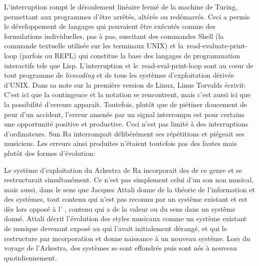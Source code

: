 {L'interruption rompt le d\'eroulement lin\'eaire ferm\'e de la machine
de Turing, permettant aux programmes d'\^etre arr\^et\'es, alt\'er\'es
ou red\'emarr\'es. Ceci a permis le d\'eveloppement de langages qui
pouvaient \^etre ex\'ecut\'es comme des formulations individuelles, pas
\`a pas, suscitant des commandes Shell (la commande textuelle
utilis\'ee sur les terminaux UNIX) et la~read{}-evaluate{}-print{}-loop
(parfois  ou REPL) qui constitue la base
des langages de programmation interactifs tels que Lisp. L'interruption
et le~read{}-eval{}-print{}-loop sont au c{\oe}ur de tout programme de
{\em livecoding} et de tous les syst\`emes d'exploitation
d\'eriv\'es d'UNIX. Dans sa note sur la premi\`ere version de Linux,
Linus Torvalds \'ecrivit: 
C'est ici que la contingence et la notation se rencontrent, mais c'est
aussi ici que la possibilit\'e d'erreurs appara\^it. Toutefois,
plut\^ot que de pi\'etiner doucement de peur d'un accident, l'erreur
amen\'ee par un signal interrompu est pour certains une opportunit\'e
positive et productive. Ceci n'est pas limit\'e \`a des interruptions
d'ordinateurs. Sun Ra interrompait d\'elib\'er\'ement ses
r\'ep\'etitions et pi\'egeait ses musiciens. Les erreurs ainsi
produites n'\'etaient toutefois pas des fautes mais plut\^ot des formes
d'\'evolution:


Le syst\`eme d'exploitation du Arkestra de Ra incorporait des 
de ce genre et se restructurait simultan\'ement. Ce  n'est pas
simplement celui d'un son non musical, mais aussi, dans le sens que
Jacques Attali donne de la th\'eorie de l'information et des
syst\`emes, tout contenu qui n'est pas reconnu par un syst\`eme
existant et est d\`es lors oppos\'e \`a l' , contenu qui a
de la valeur ou du sens dans un syst\`eme donn\'e. Attali d\'ecrit
l'\'evolution des styles musicaux comme un syst\`eme existant de
musique devenant expos\'e au  qui l'avait initialement
d\'erang\'e, et qui le restructure par incorporation et donne naissance
\`a un nouveau syst\`eme. Lors du voyage de l'Arkestra, des syst\`emes
se sont effondr\'es puis sont n\'es \`a nouveau quotidiennement.


}

